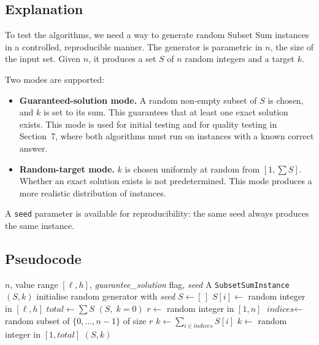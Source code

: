 \documentclass[12pt,a4paper]{article}
\theoremstyle{definition}
\begin{document}
\subsection{Explanation}

To test the algorithms, we need a way to generate random Subset Sum instances
in a controlled, reproducible manner. The generator is parametric in $n$, the
size of the input set. Given $n$, it produces a set $S$ of $n$ random integers
and a target $k$.

Two modes are supported:

\begin{itemize}
  \item \textbf{Guaranteed-solution mode.} A random non-empty subset of $S$ is
    chosen, and $k$ is set to its sum. This guarantees that at least one exact
    solution exists. This mode is used for initial testing and for quality
    testing in Section~7, where both algorithms must run on instances with a
    known correct answer.

  \item \textbf{Random-target mode.} $k$ is chosen uniformly at random from
    $[1, \sum S]$. Whether an exact solution exists is not predetermined. This
    mode produces a more realistic distribution of instances.
\end{itemize}

A \texttt{seed} parameter is available for reproducibility: the same seed
always produces the same instance.

\subsection{Pseudocode}

\begin{algorithm}[H]
\caption{Generate Instance}
\label{alg:gen}
\begin{algorithmic}[1]
\Require $n$, value range $[\ell, h]$, \textit{guarantee\_solution} flag, \textit{seed}
\Ensure A \texttt{SubsetSumInstance} $(S, k)$
    \State initialise random generator with \textit{seed}
\EndIf
\State $S \gets [\,]$
    \State $S[i] \gets $ random integer in $[\ell, h]$
\EndFor
\State $\textit{total} \gets \sum S$
    \State \Return $(S,\; k{=}0)$ 
\EndIf
{}
    \State $r \gets $ random integer in $[1, n]$
    \State $\textit{indices} \gets $ random subset of $\{0, \ldots, n{-}1\}$ of size $r$
    \State $k \gets \sum_{i \in \textit{indices}} S[i]$
\Else
    \State $k \gets $ random integer in $[1, \textit{total}]$
\EndIf
\State \Return $(S, k)$
\end{algorithmic}
\end{algorithm}
\end{document}
